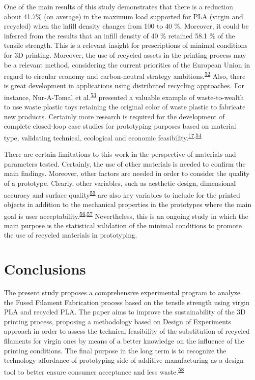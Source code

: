 \documentclass[
  12pt]{article}
\begin{document}
One of the main results of this study demonstrates that there is a reduction about 41.7\% (on average) in the maximum load supported for PLA (virgin and recycled) when the infill density changes from 100 to 40 \%.
Moreover, it could be inferred from the results that an infill density of 40 \% retained 58.1 \% of the tensile strength.
This is a relevant insight for prescriptions of minimal conditions for 3D printing. Moreover, the use of recycled assets in the printing process may be a relevant method, considering the current priorities of the European Union in regard to circular economy and carbon-neutral strategy ambitions.\textsuperscript{\protect\hyperlink{ref-Schwarz2021}{52}}
Also, there is great development in applications using distributed recycling approaches. For instance, Nur-A-Tomal et al.\textsuperscript{\protect\hyperlink{ref-Nur-A-Tomal2020}{53}} presented a valuable example of waste-to-wealth to use waste plastic toys retaining the original color of waste plastic to fabricate new products. Certainly more research is required for the development of complete closed-loop case studies for prototyping purposes based on material type, validating technical, ecological and economic feasibility.\textsuperscript{\protect\hyperlink{ref-CruzSanchez2020}{17},\protect\hyperlink{ref-Sauerwein2019}{54}}

There are certain limitations to this work in the perspective of materials and parameters tested.
Certainly, the use of other materials is needed to confirm the main findings.
Moreover, other factors are needed in order to consider the quality of a prototype. Clearly, other variables, such as aesthetic design, dimensional accuracy and surface quality\textsuperscript{\protect\hyperlink{ref-Jin2017}{55}} are also key variables to include for the printed objects in addition to the mechanical properties in the prototypes where the main goal is user acceptability.\textsuperscript{\protect\hyperlink{ref-Sauer2009}{56},\protect\hyperlink{ref-Sauer2010}{57}}
Nevertheless, this is an ongoing study in which the main purpose is the statistical validation of the minimal conditions to promote the use of recycled materials in prototyping.

\hypertarget{section:conclusions}{%
\section{Conclusions}\label{section:conclusions}}

The present study proposes a comprehensive experimental program to analyze the Fused Filament Fabrication process based on the tensile strength using virgin PLA and recycled PLA. The paper aims to improve the sustainability of the 3D printing process, proposing a methodology based on Design of Experiments approach in order to assess the technical feasibility of the substitution of recycled filaments for virgin ones by means of a better knowledge on the influence of the printing conditions. The final purpose in the long term is to recognize the technology affordance of prototyping side of additive manufacturing as a design tool to better ensure consumer acceptance and less waste.\textsuperscript{\protect\hyperlink{ref-Kohtala2015a}{58}}
\end{document}

